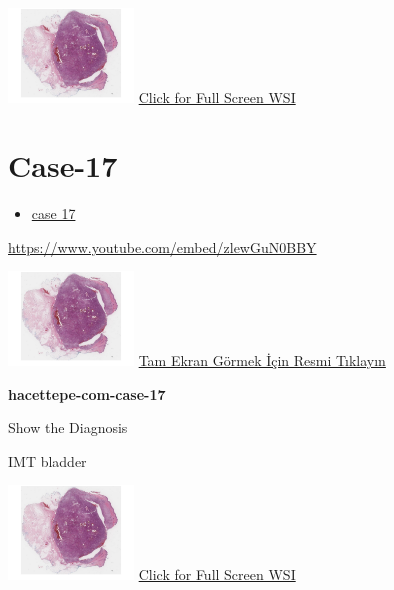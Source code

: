 \documentclass[
  letterpaper,
  paper=6in:9in,
  pagesize=pdftex,
  headinclude=on,
  footinclude=on,
  12pt]{scrbook}
\providecommand{\tightlist}{%
  \setlength{\itemsep}{0pt}\setlength{\parskip}{0pt}}\usepackage{longtable,booktabs,array}
\begin{document}
\href{https://images.patolojiatlasi.com/hacettepe-com-case-1/HE.html}{\includegraphics[width=0.25\textwidth,height=\textheight]{./screenshots/hacettepe-com-case-1_screenshot.png}}
\href{https://images.patolojiatlasi.com/hacettepe-com-case-/HE.html}{Click
for Full Screen WSI}

\hypertarget{sec-hacettepe-case-of-the-month-case-17}{%
\section{Case-17}\label{sec-hacettepe-case-of-the-month-case-17}}

\begin{itemize}
\tightlist
\item
  \href{https://www.youtube.com/watch?v=zlewGuN0BBY\&ab_channel=KemalKosemehmetoglu}{case
  17}
\end{itemize}

\url{https://www.youtube.com/embed/zlewGuN0BBY}

\href{https://images.patolojiatlasi.com/hacettepe-com-case-1/HE.html}{\includegraphics[width=0.25\textwidth,height=\textheight]{./screenshots/hacettepe-com-case-1_screenshot.png}}
\href{https://images.patolojiatlasi.com/hacettepe-com-case-17/HE1.html}{Tam
Ekran Görmek İçin Resmi Tıklayın}

\textbf{hacettepe-com-case-17}

Show the Diagnosis

\hypertarget{answer17}{}
IMT bladder

\href{https://images.patolojiatlasi.com/hacettepe-com-case-1/HE.html}{\includegraphics[width=0.25\textwidth,height=\textheight]{./screenshots/hacettepe-com-case-1_screenshot.png}}
\href{https://images.patolojiatlasi.com/hacettepe-com-case-17/HE1.html}{Click
for Full Screen WSI}
\end{document}
